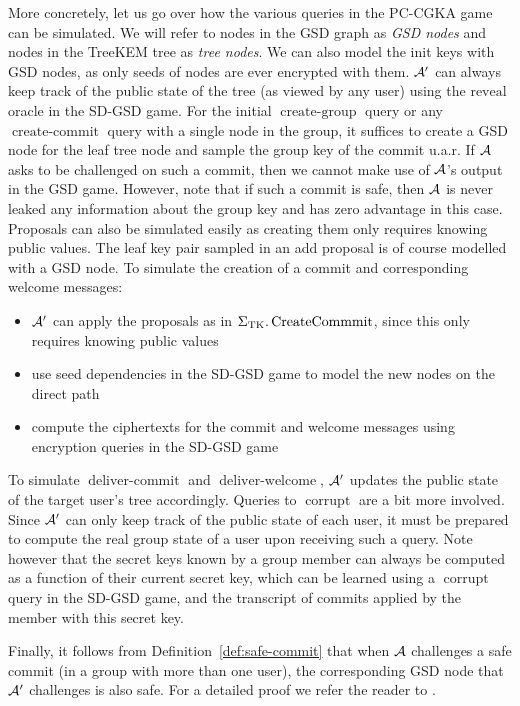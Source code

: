 More concretely, let us go over how the various queries in the PC-CGKA game can be simulated. We will refer to nodes in the GSD graph as \emph{GSD nodes} and nodes in the TreeKEM tree as \emph{tree nodes}. We can also model the init keys with GSD nodes, as only seeds of nodes are ever encrypted with them. $\mathcal{A}'$ can always keep track of the public state of the tree (as viewed by any user) using the $\mathrm{reveal}$ oracle in the SD-GSD game. For the initial $\operatorname{create-group}$ query or any $\operatorname{create-commit}$ query with a single node in the group, it suffices to create a GSD node for the leaf tree node and sample the group key of the commit u.a.r. If $\mathcal{A}$ asks to be challenged on such a commit, then we cannot make use of $\mathcal{A}$'s output in the GSD game. However, note that if such a commit is safe, then $\mathcal{A}$ is never leaked any information about the group key and has zero advantage in this case. Proposals can also be simulated easily as creating them only requires knowing public values. The leaf key pair sampled in an add proposal is of course modelled with a GSD node. To simulate the creation of a commit and corresponding welcome messages:
\begin{itemize}
	\item $\mathcal{A}'$ can apply the proposals as in $\Sigma_{\mathrm{TK}}.\operatorname{CreateCommmit}$, since this only requires knowing public values
	\item use seed dependencies in the SD-GSD game to model the new nodes on the direct path
	\item compute the ciphertexts for the commit and welcome messages using encryption queries in the SD-GSD game
\end{itemize}
To simulate $\operatorname{deliver-commit}$ and $\operatorname{deliver-welcome}$, $\mathcal{A}'$ updates the public state of the target user's tree accordingly. Queries to $\operatorname{corrupt}$ are a bit more involved. Since $\mathcal{A}'$ can only keep track of the public state of each user, it must be prepared to compute the real group state of a user upon receiving such a query. Note however that the secret keys known by a group member can always be computed as a function of their current secret key, which can be learned using a $\operatorname{corrupt}$ query in the SD-GSD game, and the transcript of commits applied by the member with this secret key.

Finally, it follows from Definition~\ref{def:safe-commit} that when $\mathcal{A}$ challenges a safe commit (in a group with more than one user), the corresponding GSD node that $\mathcal{A}'$ challenges is also safe. For a detailed proof we refer the reader to \cite[Theorem 12]{modular-group-messaging}.

